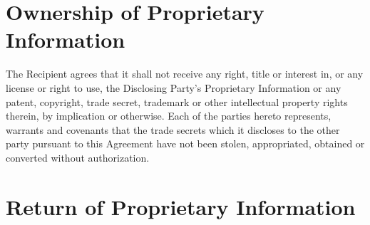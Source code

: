\documentclass[12pt]{article}
\begin{document}
\section{Ownership of Proprietary Information}
The Recipient agrees that it shall not receive any right, title or interest in, or any license or right to use, the Disclosing Party's Proprietary Information or any patent, copyright, trade secret, trademark or other intellectual property rights therein, by implication or otherwise.
Each of the parties hereto represents, warrants and covenants that the trade secrets which it discloses to the other party pursuant to this Agreement have not been stolen, appropriated, obtained or converted without authorization.

\section{Return of Proprietary Information}
\end{document}
